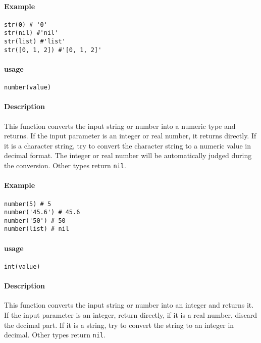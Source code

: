 \paragraph{Example}
\begin{lstlisting}[language=berry, numbers=none]
str(0) # '0'
str(nil) #'nil'
str(list) #'list'
str([0, 1, 2]) #'[0, 1, 2]'
\end{lstlisting}


\paragraph{usage}
\begin{lstlisting}[language=berry, numbers=none]
number(value)
\end{lstlisting}

\paragraph{Description}
This function converts the input string or number into a numeric type and returns. If the input parameter is an integer or real number, it returns directly. If it is a character string, try to convert the character string to a numeric value in decimal format. The integer or real number will be automatically judged during the conversion. Other types return \texttt{nil}.

\paragraph{Example}
\begin{lstlisting}[language=berry, numbers=none]
number(5) # 5
number('45.6') # 45.6
number('50') # 50
number(list) # nil
\end{lstlisting}


\paragraph{usage}
\begin{lstlisting}[language=berry, numbers=none]
int(value)
\end{lstlisting}

\paragraph{Description}
This function converts the input string or number into an integer and returns it. If the input parameter is an integer, return directly, if it is a real number, discard the decimal part. If it is a string, try to convert the string to an integer in decimal. Other types return \texttt{nil}.

